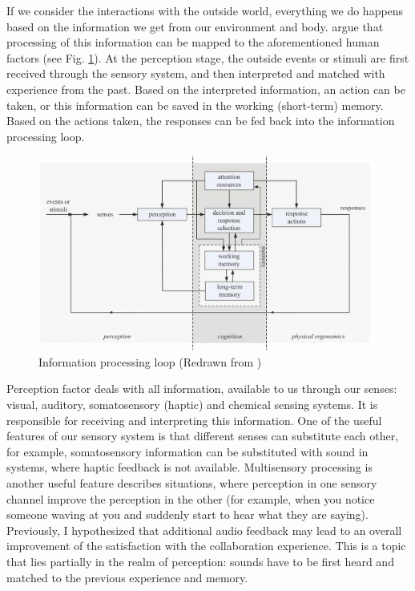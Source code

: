 
If we consider the interactions with the outside world, everything we do happens based on the information we get from our environment and body. \cite{jr_3d_2017} argue that processing of this information can be mapped to the aforementioned human factors (see Fig. \ref{fig:informationprocessingloop}).
At the perception stage, the outside events or stimuli are first received through the sensory system, and then interpreted and matched with experience from the past. Based on the interpreted information, an action can be taken, or this information can be saved in the working (short-term) memory. 
Based on the actions taken, the responses can be fed back into the information processing loop.

\begin{figure}
	\centering
	\includegraphics[width=0.7\linewidth]{figures/placeholders/information_processing_loop}
	\caption{Information processing loop (Redrawn from \cite{jr_3d_2017})}
	\label{fig:informationprocessingloop}
\end{figure}

Perception factor deals with all information, available to us through our senses: visual, auditory, somatosensory (haptic) and chemical sensing systems. It is responsible for receiving and interpreting this information.
One of the useful features of our sensory system is that different senses can substitute each other, for example, somatosensory information can be substituted with sound in systems, where haptic feedback is not available. Multisensory processing is another useful feature describes situations, where perception in one sensory channel improve the perception in the other (for example, when you notice someone waving at you and suddenly start to hear what they are saying).
Previously, I hypothesized that additional audio feedback may lead to an overall improvement of the satisfaction with the collaboration experience. This is a topic that lies partially in the realm of perception: sounds have to be first heard and matched to the previous experience and memory.

